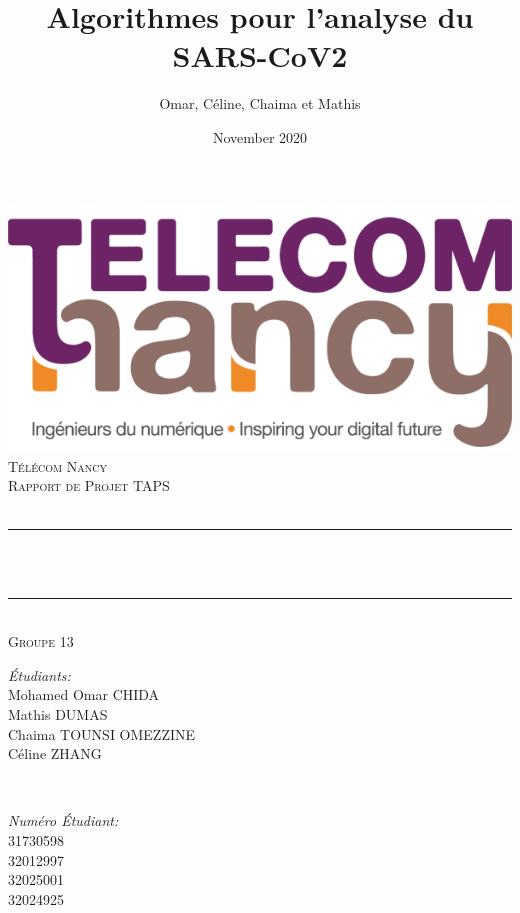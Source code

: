 \documentclass[12pt]{article}
\title{Algorithmes pour l'analyse du SARS-CoV2}
\author{Omar, Céline, Chaima et Mathis}
\date{November 2020}
\makeatletter
\let\thetitle\@title
\let\thedate\@date
\makeatother
\begin{document}
\begin{titlepage}
    \centering
    
 	\includegraphics[scale=0.36]{logo_TN_horizontal}\\[1.0 cm]
 	
	\textsc{\LARGE Télécom Nancy}\\[1.5 cm]
	\textsc{\Large Rapport de Projet TAPS}\\[0.5 cm]
	{\large \thedate}\\[0.5 cm]
	\rule{\linewidth}{0.2 mm} \\[0.5 cm]
	{ \huge \bfseries \thetitle}\\[0.2 cm]
	\rule{\linewidth}{0.2 mm} \\[1.5 cm]
	\textsc{\large Groupe 13}\\[1.0 cm]
	
	\begin{minipage}{0.4\textwidth}
		\begin{flushleft} \large
		\emph{Étudiants:}\\
			Mohamed Omar CHIDA \\
			Mathis DUMAS \\
			Chaima TOUNSI OMEZZINE \\
			Céline ZHANG
		\end{flushleft}
	\end{minipage}~
	\begin{minipage}{0.4\textwidth}
		\begin{flushright} \large
		\emph{Numéro Étudiant:}\\
			31730598 \\
			32012997 \\
			32025001 \\
			32024925
		\end{flushright}
	\end{minipage}\\[1.4 cm]
	

\end{titlepage}
\end{document}
